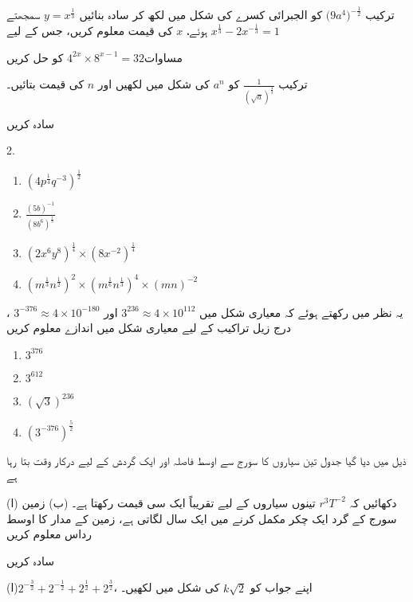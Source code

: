 
ترکیب \(\big(9a^{4}\big)^{-\frac{1}{2}}\)
کو الجبرائی کسرے کی شکل میں لکھ کر سادہ بنائیں
\(y=x^{\frac{1}{3}}\) سمجھتے ہوئے، \(x\) کی قیمت معلوم کریں، جس کے لیے \(x^{\frac{1}{3}}-2x^{-\frac{1}{3}}=1\)


مساوات\(4^{2x}\times 8^{x-1}=32\) کو حل کریں


ترکیب \(\frac{1}{(\sqrt{a})^\frac{4}{3}}\) کو \(a^n\) کی شکل میں لکھیں اور  \(n\) کی قیمت بتائیں۔


سادہ کریں
\begin{multicols}{2.}
\begin{enumerate}[.a]
\item
\((4p^{\frac{1}{4}}q^{-3})^{\frac{1}{2}}\)
\item
\(\frac{(5b)^{-1}}{(8b^{6})^{\frac{1}{3}}}\)
\item
\((2x^{6}y^{8})^{\frac{1}{4}}\times (8x^{-2})^{\frac{1}{4}}\)
\item
\((m^{\frac{1}{3}}n^{\frac{1}{2}})^2\times (m^{\frac{1}{6}}n^{\frac{1}{3}})^{4}\times(mn)^{-2}\)
\end{enumerate}
\end{multicols}

یہ نظر میں رکھتے ہوئے کہ معیاری شکل میں \(3^{236}\approx4\times10^{112}\) اور \(3^{-376}\approx4\times 10^{-180}\)
، درج زیل تراکیب کے لیے معیاری شکل میں اندازے معلوم کریں

\begin{multicols}{4}
\begin{enumerate}[.a]
\item
\(3^{376}\)
\item
\(3^{612}\)
\item
\((\sqrt{3})^{236}\)
\item
\((3^{-376})^{\frac{5}{2}}\)
\end{enumerate}
\end{multicols}


ذیل میں دیا گیا جدول تین سیاروں کا سورج سے اوسط فاصلہ اور ایک گردش کے لیے درکار وقت بتا رہا ہے

(ا) دکھائیں کہ 
\(r^{3}T^{-2}\) تینوں سیاروں کے لیے تقریباً ایک سی قیمت رکھتا ہے۔
(ب) زمین سورج کے گرد ایک چکر مکمل کرنے میں ایک سال لگاتی ہے، زمین کے مدار کا اوسط رداس معلوم کریں


سادہ کریں

(ا)\(2^{-\frac{3}{2}}+2^{-\frac{1}{2}}+2^{\frac{1}{2}}+2^{\frac{3}{2}}\)، اپنے جواب کو \(k\sqrt{2}\)
 کی شکل میں لکھیں۔

